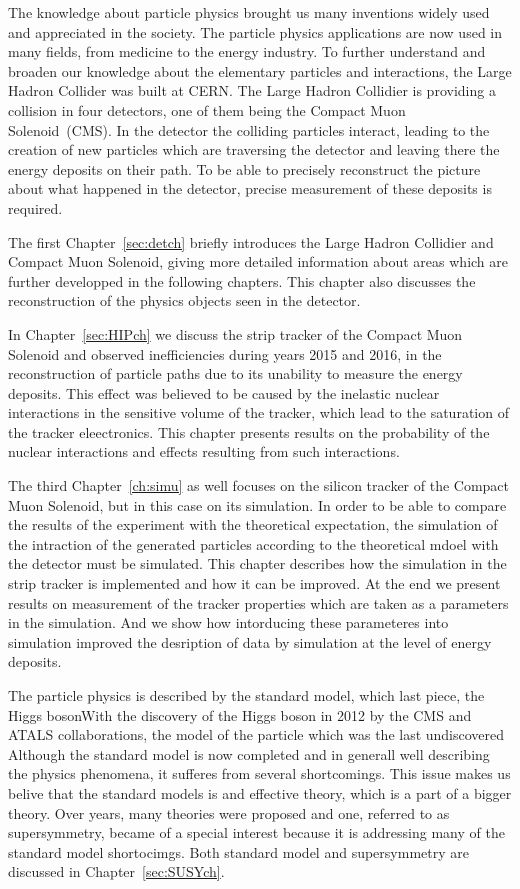 
The knowledge about particle physics brought us many inventions widely used and appreciated in the society. The particle physics applications are now used in many fields, from medicine to the energy industry. To further understand and broaden our knowledge about the elementary particles and interactions, the Large Hadron Collider was built at CERN. The Large Hadron Collidier is providing a collision in four detectors, one of them being the Compact Muon Solenoid~(CMS). In the detector the colliding particles interact, leading to the creation of new particles which are traversing the detector and leaving there the energy deposits on their path. To be able to precisely reconstruct the picture about what happened in the detector, precise measurement of these deposits is required.

The first Chapter~\ref{sec:detch} briefly introduces the Large Hadron Collidier and Compact Muon Solenoid, giving more detailed information about areas which are further developped in the following chapters. This chapter also discusses the reconstruction of the physics objects seen in the detector.

In Chapter~\ref{sec:HIPch} we discuss the strip tracker of the Compact Muon Solenoid and observed inefficiencies during years 2015 and 2016, in the reconstruction of particle paths due to its unability to measure the energy deposits. This effect was believed to be caused by the inelastic nuclear interactions in the sensitive volume of the tracker, which lead to the saturation of the tracker eleectronics. This chapter presents results on the probability of the nuclear interactions and effects resulting from such interactions. 

The third Chapter~\ref{ch:simu} as well focuses on the silicon tracker of the Compact Muon Solenoid, but in this case on its simulation. In order to be able to compare the results of the experiment with the theoretical expectation, the simulation of the intraction of the generated particles according to the theoretical mdoel with the detector must be simulated. This chapter describes how the simulation in the strip tracker is implemented and how it can be improved. At the end we present results on measurement of the tracker properties which are taken as a parameters in the simulation. And we show how intorducing these parameteres into simulation improved the desription of data by simulation at the level of energy deposits.

The particle physics is described by the standard model, which last piece, the Higgs bosonWith the discovery of the Higgs boson in 2012 by the CMS and ATALS collaborations, the model of the particle which was the last undiscovered Although the standard model is now completed and in generall well describing the physics phenomena, it sufferes from several shortcomings. This issue makes us belive that the standard models is and effective theory, which is a part of a bigger theory. Over years, many theories  were proposed and one, referred to as supersymmetry, became of a special interest because it is addressing  many of the standard model shortocimgs. Both standard model and supersymmetry are discussed in Chapter~\ref{sec:SUSYch}.

